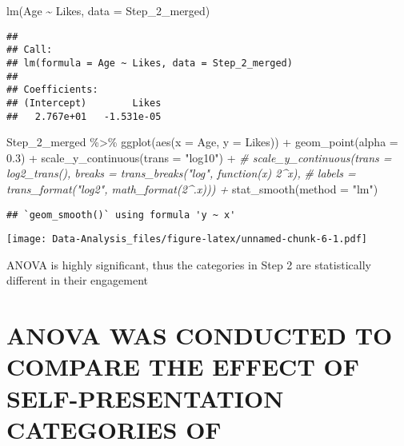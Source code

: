 \documentclass[
]{article}
\newenvironment{Shaded}{\begin{snugshade}}{\end{snugshade}}
\newcommand{\AttributeTok}[1]{\textcolor[rgb]{0.77,0.63,0.00}{#1}}
\newcommand{\CommentTok}[1]{\textcolor[rgb]{0.56,0.35,0.01}{\textit{#1}}}
\newcommand{\FloatTok}[1]{\textcolor[rgb]{0.00,0.00,0.81}{#1}}
\newcommand{\FunctionTok}[1]{\textcolor[rgb]{0.00,0.00,0.00}{#1}}
\newcommand{\NormalTok}[1]{#1}
\newcommand{\SpecialCharTok}[1]{\textcolor[rgb]{0.00,0.00,0.00}{#1}}
\newcommand{\StringTok}[1]{\textcolor[rgb]{0.31,0.60,0.02}{#1}}
\begin{document}
\begin{Shaded}
\begin{Highlighting}[]
\FunctionTok{lm}\NormalTok{(Age }\SpecialCharTok{\textasciitilde{}}\NormalTok{ Likes, }\AttributeTok{data =}\NormalTok{ Step\_2\_merged)}
\end{Highlighting}
\end{Shaded}

\begin{verbatim}
## 
## Call:
## lm(formula = Age ~ Likes, data = Step_2_merged)
## 
## Coefficients:
## (Intercept)        Likes  
##   2.767e+01   -1.531e-05
\end{verbatim}

\begin{Shaded}
\begin{Highlighting}[]
\NormalTok{Step\_2\_merged }\SpecialCharTok{\%\textgreater{}\%}
\FunctionTok{ggplot}\NormalTok{(}\FunctionTok{aes}\NormalTok{(}\AttributeTok{x =}\NormalTok{ Age, }\AttributeTok{y =}\NormalTok{ Likes)) }\SpecialCharTok{+}
  \FunctionTok{geom\_point}\NormalTok{(}\AttributeTok{alpha =} \FloatTok{0.3}\NormalTok{) }\SpecialCharTok{+}
  \FunctionTok{scale\_y\_continuous}\NormalTok{(}\AttributeTok{trans =} \StringTok{"log10"}\NormalTok{) }\SpecialCharTok{+}
 \CommentTok{\# scale\_y\_continuous(trans = log2\_trans(), breaks = trans\_breaks("log", function(x) 2\^{}x), }
  \CommentTok{\#                   labels = trans\_format("log2", math\_format(2\^{}.x))) +}
  \FunctionTok{stat\_smooth}\NormalTok{(}\AttributeTok{method =} \StringTok{"lm"}\NormalTok{)}
\end{Highlighting}
\end{Shaded}

\begin{verbatim}
## `geom_smooth()` using formula 'y ~ x'
\end{verbatim}

\texttt{[image: Data-Analysis\_files/figure-latex/unnamed-chunk-6-1.pdf]}

ANOVA is highly significant, thus the categories in Step 2 are
statistically different in their engagement

\hypertarget{anova-was-conducted-to-compare-the-effect-of-self-presentation-categories-of}{%
\section{ANOVA WAS CONDUCTED TO COMPARE THE EFFECT OF SELF-PRESENTATION
CATEGORIES
OF}\label{anova-was-conducted-to-compare-the-effect-of-self-presentation-categories-of}}
\end{document}
